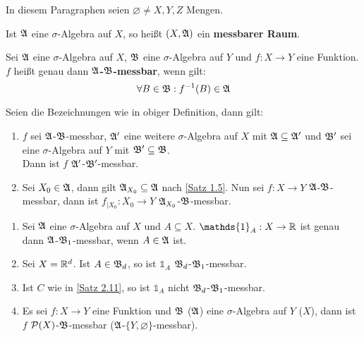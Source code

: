 \documentclass[a4paper,twoside,DIV15,BCOR12mm,chapterprefix=true,headings=onelinechapter]{scrbook}
\begin{document}
In diesem Paragraphen seien $\varnothing\ne X,Y,Z$ Mengen.

\begin{definition}
Ist $\mathfrak{A}$ eine $\sigma$-Algebra auf $X$, so heißt $(X,\mathfrak{A})$ ein \textbf{messbarer Raum}.
\end{definition}

\begin{definition}
Sei $\mathfrak{A}$ eine $\sigma$-Algebra auf $X$, $\mathfrak{B}$ eine $\sigma$-Algebra auf $Y$ und $f:X\to Y$ eine Funktion. $f$ heißt genau dann \textbf{$\mathfrak{A}$-$\mathfrak{B}$-messbar}, wenn gilt:
\[\forall B\in\mathfrak{B}: f^{-1}(B)\in\mathfrak{A}\]
\end{definition}

\begin{bemerkung}
Seien die Bezeichnungen wie in obiger Definition, dann gilt:
\begin{enumerate}
\item $f$ sei $\mathfrak{A}$-$\mathfrak{B}$-messbar, $\mathfrak{A}'$ eine weitere $\sigma$-Algebra auf $X$ mit $\mathfrak{A}\subseteq\mathfrak{A}'$ und $\mathfrak{B}'$ sei eine $\sigma$-Algebra auf $Y$ mit $\mathfrak{B}'\subseteq\mathfrak{B}$.\\
Dann ist $f$ $\mathfrak{A}'$-$\mathfrak{B}'$-messbar.
\item Sei $X_0\in\mathfrak{A}$, dann gilt $\mathfrak{A}_{X_0}\subseteq\mathfrak{A}$ nach \ref{Satz 1.5}. Nun sei $f:X\to Y$ $\mathfrak{A}$-$\mathfrak{B}$-messbar, dann ist $f_{\mid X_0}:X_0\to Y$ $\mathfrak{A}_{X_0}$-$\mathfrak{B}$-messbar.
\end{enumerate}
\end{bemerkung}

\begin{beispiel}
\begin{enumerate}
\item Sei $\mathfrak{A}$ eine $\sigma$-Algebra auf $X$ und $A\subseteq X$. $\mathds{1}_A:X\to\mdr$ ist genau dann $\mathfrak{A}$-$\mathfrak{B}_1$-messbar, wenn $A\in\mathfrak{A}$ ist.
\item Sei $X=\mathbb{R}^d$. Ist $A\in\mathfrak{B}_d$, so ist $\mathds{1}_A$ $\mathfrak{B}_d$-$\mathfrak{B}_1$-messbar.
\item Ist $C$ wie in \ref{Satz 2.11}, so ist $\mathds{1}_A$ nicht $\mathfrak{B}_d$-$\mathfrak{B}_1$-messbar.
\item Es sei $f:X\to Y$ eine Funktion und $\mathfrak{B}$ ($\mathfrak{A}$) eine $\sigma$-Algebra auf $Y$ ($X$), dann ist $f$ $\mathcal{P}(X)$-$\mathfrak{B}$-messbar ($\mathfrak{A}$-$\{Y,\varnothing\}$-messbar).
\end{enumerate}
\end{beispiel}
\end{document}
